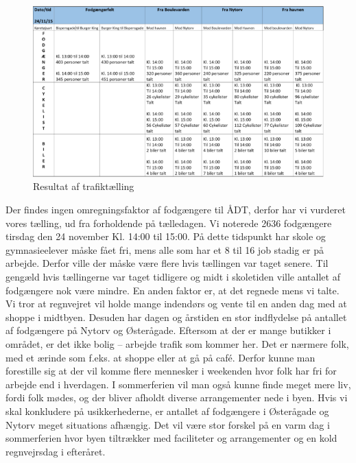\begin{figure}[htbp]
   \label{fig:trafiktaellingen}
   \centering
   \begin{adjustbox}{max width=\textwidth}
     \includegraphics[scale=1]{billederogfigur/trafiktaellingen.jpg}
  \end{adjustbox}
   \caption{Resultat af trafiktælling}
 \end{figure}
Der findes ingen omregningsfaktor af fodgængere til ÅDT, derfor har vi vurderet vores tælling, ud fra forholdende på tælledagen. Vi noterede 2636 fodgængere tirsdag den 24 november Kl. 14:00 til 15:00. På dette tidspunkt har skole og gymnasieelever måske fået fri, mens alle som har et 8 til 16 job stadig er på arbejde. Derfor ville der måske være flere hvis tællingen var taget senere. Til gengæld hvis tællingerne var taget tidligere og midt i skoletiden ville antallet af fodgængere nok være mindre. En anden faktor er, at det regnede mens vi talte. Vi tror at regnvejret vil holde mange indendørs og vente til en anden dag med at shoppe i midtbyen. Desuden har dagen og årstiden en stor indflydelse på antallet af fodgængere på Nytorv og Østerågade. Eftersom at der er mange butikker i området, er det ikke bolig – arbejde trafik som kommer her. Det er nærmere folk, med et ærinde som f.eks. at shoppe eller at gå på café. Derfor kunne man forestille sig at der vil komme flere mennesker i weekenden hvor folk har fri for arbejde end i hverdagen. I sommerferien vil man også kunne finde meget mere liv, fordi folk mødes, og der bliver afholdt diverse arrangementer nede i byen. Hvis vi skal konkludere på usikkerhederne, er antallet af fodgængere i Østerågade og Nytorv meget situations afhængig. Det vil være stor forskel på en varm dag i sommerferien hvor byen tiltrækker med faciliteter og arrangementer og en kold regnvejrsdag i efteråret.

